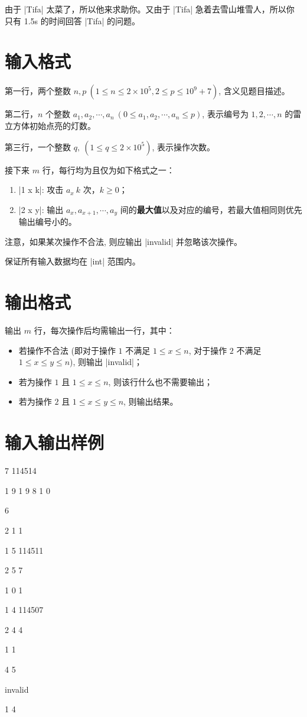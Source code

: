 \documentclass{ctpro}
\begin{document}
由于 |Tifa| 太菜了，所以他来求助你。又由于 |Tifa| 急着去雪山堆雪人，所以你只有 1.5s 的时间回答 |Tifa| 的问题。

\section*{输入格式}

第一行，两个整数 $n,p~(1 \leq n \leq 2 \times 10^5, 2 \leq p \leq 10^9+7)$, 含义见题目描述。

第二行，$n$ 个整数 $a_1, a_2, \cdots, a_n~(0 \leq a_1, a_2, \cdots, a_n \leq p)$, 表示编号为 $1,2, \cdots, n$ 的雷立方体初始点亮的灯数。

第三行，一个整数 $q,~(1 \leq q \leq 2 \times 10^5)$, 表示操作次数。

接下来 $m$ 行，每行均为且仅为如下格式之一：

\begin{enumerate}
	\item |1 x k|: 攻击 $a_x~k$ 次，$k \geq 0$；
	\item |2 x y|: 输出 $a_x, a_{x+1}, \cdots, a_y$ 间的\textbf{最大值}以及对应的编号，若最大值相同则优先输出编号小的。
\end{enumerate}

注意，如果某次操作不合法, 则应输出 |invalid| 并忽略该次操作。

保证所有输入数据均在 |int| 范围内。

\section*{输出格式}

输出 $m$ 行，每次操作后均需输出一行，其中：

\begin{itemize}
	\item 若操作不合法 (即对于操作 $1$ 不满足 $1 \leq x \leq n$, 对于操作 $2$ 不满足 $1 \leq x \leq y \leq n$), 则输出 |invalid|；
	\item 若为操作 $1$ 且 $1 \leq x \leq n$, 则该行什么也不需要输出；
	\item 若为操作 $2$ 且 $1 \leq x \leq y \leq n$, 则输出结果。
\end{itemize}

\section*{输入输出样例}
\testcasetab
{
	7 114514\par
    1 9 1 9 8 1 0\par
    6\par
    2 1 1\par
    1 5 114511\par
    2 5 7\par
    1 0 1\par
    1 4 114507\par
    2 4 4
}
{
    1 1\par
    \hspace*{\fill} \par
    4 5\par
    invalid\par
    \hspace*{\fill} \par
    1 4
}
\end{document}
